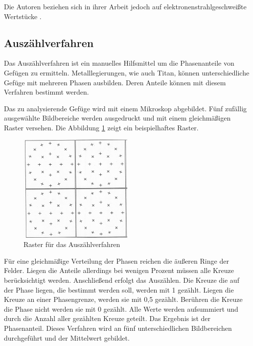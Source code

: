 \documentclass[a4paper, 11pt]{tubsreprt}
\begin{document}
Die Autoren beziehen sich in ihrer Arbeit jedoch auf elektronenstrahlgeschweißte Wertstücke \cite{Shi2013}.
\subsection{Auszählverfahren}
Das Auszählverfahren ist ein manuelles Hilfsmittel um die Phasenanteile von Gefügen zu ermitteln. Metalllegierungen, wie auch Titan, können unterschiedliche Gefüge mit mehreren Phasen ausbilden. Deren Anteile können mit diesem Verfahren bestimmt werden.

Das zu analysierende Gefüge wird mit einem Mikroskop abgebildet. Fünf zufällig ausgewählte Bildbereiche werden ausgedruckt und mit einem gleichmäßigen Raster versehen. Die Abbildung \ref{Raster für das Auszählverfahren} zeigt ein beispielhaftes Raster.
\begin{figure} %
\centering
\includegraphics[width=0.5\textwidth]{Bilder/Raster.png}
\caption{Raster für das Auszählverfahren}
\label{Raster für das Auszählverfahren}
\end{figure}

Für eine gleichmäßige Verteilung der Phasen reichen die äußeren Ringe der Felder. Liegen die Anteile allerdings bei wenigen Prozent müssen alle Kreuze berücksichtigt werden. 
Anschließend erfolgt das Auszählen. Die Kreuze die auf der Phase liegen, die bestimmt werden soll, werden mit 1 gezählt. Liegen die Kreuze an einer Phasengrenze, werden sie mit 0,5 gezählt. Berühren die Kreuze die Phase nicht werden sie mit 0 gezählt. Alle Werte werden aufsummiert und durch die Anzahl aller gezählten Kreuze geteilt. Das Ergebnis ist der Phasenanteil. Dieses Verfahren wird an fünf unterschiedlichen Bildbereichen durchgeführt und der Mittelwert gebildet.
\end{document}
